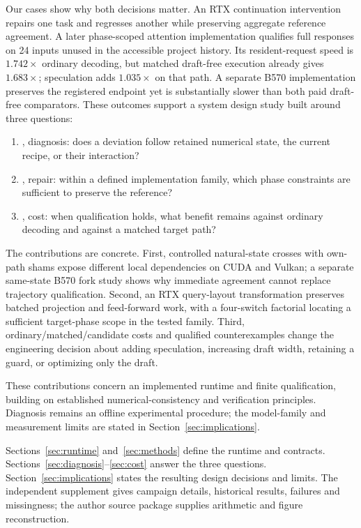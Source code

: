 Our cases show why both decisions matter. An RTX continuation intervention repairs one task and regresses another while preserving aggregate reference agreement. A later phase-scoped attention implementation qualifies full responses on 24 inputs unused in the accessible project history. Its resident-request speed is $1.742\times$ ordinary decoding, but matched draft-free execution already gives $1.683\times$; speculation adds $1.035\times$ on that path. A separate B570 implementation preserves the registered endpoint yet is substantially slower than both paid draft-free comparators. These outcomes support a system design study built around three questions:
\begin{enumerate}
\item {}, diagnosis: does a deviation follow retained numerical state, the current recipe, or their interaction?
\item {}, repair: within a defined implementation family, which phase constraints are sufficient to preserve the reference?
\item {}, cost: when qualification holds, what benefit remains against ordinary decoding and against a matched target path?
\end{enumerate}

The contributions are concrete. First, controlled natural-state crosses with own-path shams expose different local dependencies on CUDA and Vulkan; a separate same-state B570 fork study shows why immediate agreement cannot replace trajectory qualification. Second, an RTX query-layout transformation preserves batched projection and feed-forward work, with a four-switch factorial locating a sufficient target-phase scope in the tested family. Third, ordinary/matched/candidate costs and qualified counterexamples change the engineering decision about adding speculation, increasing draft width, retaining a guard, or optimizing only the draft.

These contributions concern an implemented runtime and finite qualification, building on established numerical-consistency and verification principles. Diagnosis remains an offline experimental procedure; the model-family and measurement limits are stated in Section~\ref{sec:implications}.

Sections~\ref{sec:runtime} and~\ref{sec:methods} define the runtime and contracts. Sections~\ref{sec:diagnosis}--\ref{sec:cost} answer the three questions. Section~\ref{sec:implications} states the resulting design decisions and limits. The independent supplement gives campaign details, historical results, failures and missingness; the author source package supplies arithmetic and figure reconstruction.
